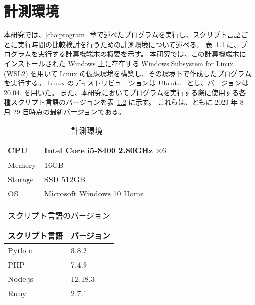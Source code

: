 \chapter{計測環境}
\label{cha:environment}

本研究では、\ref{cha:program}~章で述べたプログラムを実行し、スクリプト言語ごとに実行時間の比較検討を行うための計測環境について述べる。
表~\ref{tbl:environment} に、プログラムを実行する計算機端末の概要を示す。
本研究では、この計算機端末にインストールされた Windows 上に存在する Windows Subsystem for Linux (WSL2) を用いて
Linux の仮想環境を構築し、その環境下で作成したプログラムを実行する。
Linux のディストリビューションは Ubuntu~\cite{Ubuntu} とし、バージョンは 20.04. を用いた。
また、本研究においてプログラムを実行する際に使用する各種スクリプト言語のバージョンを表~\ref{tbl:language-version} に示す。
これらは、ともに 2020 年 8 月 29 日時点の最新バージョンである。

\begin{table}[htbp]
\begin{center}
\caption{計測環境}
\label{tbl:environment}
\begin{tabular}{|l||l|} \hline
CPU & Intel Core i5-8400 2.80GHz $\times 6$ \\ \hline
Memory & 16GB \\ \hline
Storage & SSD 512GB \\ \hline
OS & Microsoft Windows 10 Home \\ \hline
\end{tabular}
\end{center}
\end{table}

\begin{table}[htbp]
\begin{center}
\caption{スクリプト言語のバージョン}
\label{tbl:language-version}
\begin{tabular}{|l|l|} \hline
スクリプト言語 & バージョン \\ \hline \hline
Python & 3.8.2 \\ \hline
PHP & 7.4.9 \\ \hline
Node.js & 12.18.3 \\ \hline
Ruby & 2.7.1 \\ \hline
\end{tabular}
\end{center}
\end{table}
